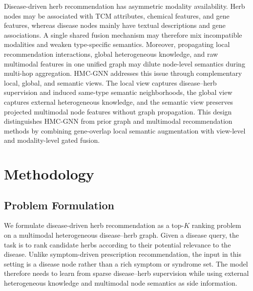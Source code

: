 \documentclass[journal,twoside,web]{ieeecolor}
\begin{document}
Disease-driven herb recommendation has asymmetric modality availability. Herb nodes may be associated with TCM attributes, chemical features, and gene features, whereas disease nodes mainly have textual descriptions and gene associations. A single shared fusion mechanism may therefore mix incompatible modalities and weaken type-specific semantics. Moreover, propagating local recommendation interactions, global heterogeneous knowledge, and raw multimodal features in one unified graph may dilute node-level semantics during multi-hop aggregation. HMC-GNN addresses this issue through complementary local, global, and semantic views. The local view captures disease--herb supervision and induced same-type semantic neighborhoods, the global view captures external heterogeneous knowledge, and the semantic view preserves projected multimodal node features without graph propagation. This design distinguishes HMC-GNN from prior graph and multimodal recommendation methods by combining gene-overlap local semantic augmentation with view-level and modality-level gated fusion.

\section{Methodology}
\label{sec:methodology}

\subsection{Problem Formulation}
\label{subsec:problem_formulation}

We formulate disease-driven herb recommendation as a top-$K$ ranking problem on a multimodal heterogeneous disease--herb graph. Given a disease query, the task is to rank candidate herbs according to their potential relevance to the disease. Unlike symptom-driven prescription recommendation, the input in this setting is a disease node rather than a rich symptom or syndrome set. The model therefore needs to learn from sparse disease--herb supervision while using external heterogeneous knowledge and multimodal node semantics as side information.
\end{document}
